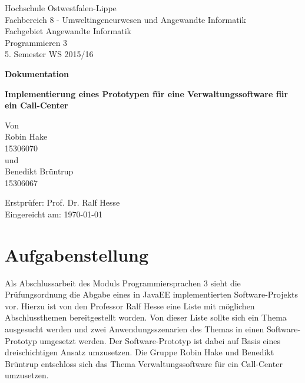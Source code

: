 \documentclass[12pt, a4paper]{article}
\begin{document}
\begin{titlepage}
Hochschule Ostwestfalen-Lippe \\
Fachbereich 8 - Umweltingeneurwesen und Angewandte Informatik \\
Fachgebiet Angewandte Informatik \\
Programmieren 3 \\
5. Semester WS 2015/16\\
\vspace{2cm}

\begin{center}
\begin{Large}
\textbf{Dokumentation} \\
\end{Large}
\vspace{2cm}

\begin{Large}
\textbf {Implementierung eines Prototypen für eine Verwaltungssoftware für ein Call-Center} \\[0.35cm]
\end{Large}
Von \\[0.35cm]
Robin Hake \\
15306070 \\[0.35cm]
und\\[0.35cm]
Benedikt Brüntrup \\
15306067 \\[0.35cm]
\end{center}

\vfill
Erstprüfer: Prof. Dr. Ralf Hesse \\
Eingereicht am: {\today}
\end{titlepage}

\newpage
\tableofcontents


\vfill
\newpage


\section{Aufgabenstellung}
Als Abschlussarbeit des Moduls \glqq Programmiersprachen 3\grqq{} sieht die Prüfungsordnung die Abgabe eines in JavaEE implementierten Software-Projekts vor. Hierzu ist von den Professor Ralf Hesse eine Liste mit möglichen Abschlussthemen bereitgestellt worden. Von dieser Liste sollte sich ein Thema ausgesucht werden und zwei Anwendungsszenarien des Themas in einen Software-Prototyp umgesetzt werden. Der Software-Prototyp ist dabei auf Basis eines dreischichtigen Ansatz umzusetzen.  Die Gruppe Robin Hake und Benedikt Brüntrup entschloss sich das Thema \glqq Verwaltungssoftware für ein Call-Center\grqq{} umzusetzen.
\end{document}

